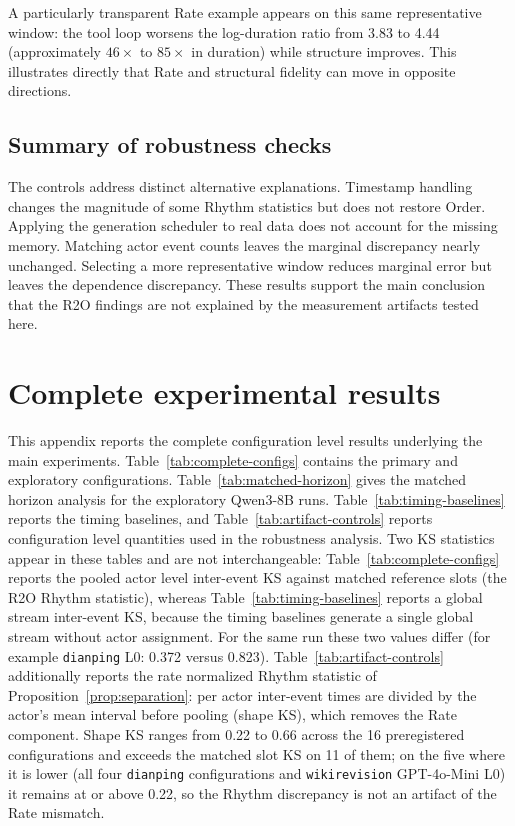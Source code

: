 A particularly transparent Rate example appears on this same representative
window: the tool loop worsens the log-duration ratio from 3.83 to 4.44
(approximately $46\times$ to $85\times$ in duration) while structure improves.
This illustrates directly that Rate and structural fidelity can move in
opposite directions.

\subsection{Summary of robustness checks}

The controls address distinct alternative explanations. Timestamp handling
changes the magnitude of some Rhythm statistics but does not restore Order.
Applying the generation scheduler to real data does not account for the
missing memory. Matching actor event counts leaves the marginal discrepancy
nearly unchanged. Selecting a more representative window reduces marginal
error but leaves the dependence discrepancy. These results support the main
conclusion that the R2O findings are not explained by the measurement artifacts
tested here.


\section{Complete experimental results}
\label{app:tables}
\label{app:complete-results}

This appendix reports the complete configuration level results underlying the
main experiments. Table~\ref{tab:complete-configs} contains the primary and
exploratory configurations. Table~\ref{tab:matched-horizon} gives the
matched horizon analysis for the exploratory Qwen3-8B runs.
Table~\ref{tab:timing-baselines} reports the timing baselines, and
Table~\ref{tab:artifact-controls} reports configuration level quantities used
in the robustness analysis. Two KS statistics appear in these tables and are
not interchangeable: Table~\ref{tab:complete-configs} reports the pooled
actor level inter-event KS against matched reference slots (the R2O Rhythm
statistic), whereas Table~\ref{tab:timing-baselines} reports a global stream
inter-event KS, because the timing baselines generate a single global stream
without actor assignment. For the same run these two values differ (for
example \texttt{dianping} L0: 0.372 versus 0.823). Table~\ref{tab:artifact-controls}
additionally reports the rate normalized Rhythm statistic of
Proposition~\ref{prop:separation}: per actor inter-event times are divided by
the actor's mean interval before pooling (shape KS), which removes the Rate
component. Shape KS ranges from 0.22 to 0.66 across the 16 preregistered
configurations and exceeds the matched slot KS on 11 of them; on the five
where it is lower (all four \texttt{dianping} configurations and
\texttt{wikirevision} GPT-4o-Mini L0) it remains at or above 0.22, so the
Rhythm discrepancy is not an artifact of the Rate mismatch.

